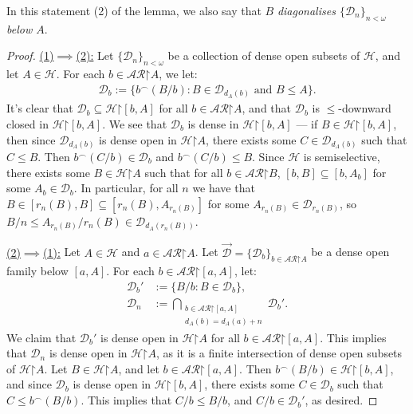 \documentclass[10pt,a4paper]{amsart}
\theoremstyle{plain}
\numberwithin{equation}{section}
\theoremstyle{definition}
\newcommand{\cal}{\mathcal}
\newcommand{\restrictedto}{\mathord{\upharpoonright}}
\renewcommand{\H}{\cal{H}}
\newcommand{\D}{\cal{D}}
\begin{document}
In this statement (2) of the lemma, we also say that $B$ \emph{diagonalises $\{\D_n\}_{n<\omega}$ below $A$}.

\begin{proof}
    \underline{(1)$\implies$(2):} Let $\{\D_n\}_{n<\omega}$ be a collection of dense open subsets of $\H$, and let $A \in \H$. For each $b \in \cal{AR}\restrictedto A$, we let:
    \begin{align*}
        \D_b := \{b^\frown(B/b) : B \in \D_{d_A(b)} \text{ and } B \leq A\}.
    \end{align*}
    It's clear that $\D_b \subseteq \H\restrictedto[b,A]$ for all $b \in \cal{AR}\restrictedto A$, and that $\D_b$ is $\leq$-downward closed in $\H\restrictedto[b,A]$. We see that $\D_b$ is dense in $\H\restrictedto[b,A]$ --- if $B \in \H\restrictedto[b,A]$, then since $\D_{d_A(b)}$ is dense open in $\H\restrictedto A$, there exists some $C \in \D_{d_A(b)}$ such that $C \leq B$. Then $b^\frown(C/b) \in \D_b$ and $b^\frown(C/b) \leq B$. Since $\H$ is semiselective, there exists some $B \in \H\restrictedto A$ such that for all $b \in \cal{AR}\restrictedto B$, $[b,B] \subseteq [b,A_b]$ for some $A_b \in \D_b$. In particular, for all $n$ we have that $B \in [r_n(B),B] \subseteq [r_n(B),A_{r_n(B)}]$ for some $A_{r_n(B)} \in \D_{r_n(B)}$, so $B/n \leq A_{r_n(B)}/r_n(B) \in \D_{d_A(r_n(B))}$.

    \underline{(2)$\implies$(1):} Let $A \in \H$ and $a \in \cal{AR}\restrictedto A$. Let $\vec{\D} = \{\D_b\}_{b \in \cal{AR}\restrictedto A}$ be a dense open family below $[a,A]$. For each $b \in \cal{AR}\restrictedto[a,A]$, let:
    \begin{align*}
        \D_b' &:= \{B/b : B \in \D_b\}, \\
        \D_n &:= \bigcap_{\substack{b \in \cal{AR}\restrictedto[a,A] \\ d_A(b) = d_A(a) + n}} \D_b'.
    \end{align*}
    We claim that $\D_b'$ is dense open in $\H\restrictedto A$ for all $b \in \cal{AR}\restrictedto[a,A]$. This implies that $\D_n$ is dense open in $\H\restrictedto A$, as it is a finite intersection of dense open subsets of $\H\restrictedto A$. Let $B \in \H\restrictedto A$, and let $b \in \cal{AR}\restrictedto[a,A]$. Then $b^\frown(B/b) \in \H\restrictedto[b,A]$, and since $\D_b$ is dense open in $\H\restrictedto[b,A]$, there exists some $C \in \D_b$ such that $C \leq b^\frown(B/b)$. This implies that $C/b \leq B/b$, and $C/b \in \D_b'$, as desired.


\end{proof}
\end{document}
